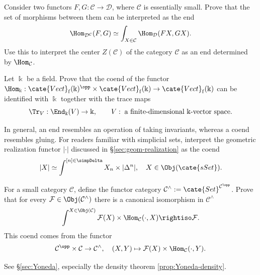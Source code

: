 \begin{Exercises}
	\item Consider two functors $F,G:\mathcal{C}\to\mathcal{D}$, where $\mathcal{C}$ is essentially small. Prove that the set of morphisms between them can be interpreted as the end
	\[ \Hom_{\mathcal{D}^{\mathcal{C}}}(F,G)\simeq
	\int_{X\in\mathcal{C}}\Hom_{\mathcal{D}}(FX,GX). \]
	Use this to interpret the center $Z(\mathcal{C})$ of the category $\mathcal{C}$ as an end determined by $\Hom_{\mathcal{C}}$.

	\item Let $\Bbbk$ be a field. Prove that the coend of the functor
	$\Hom_{\Bbbk}:\cate{Vect}_{\mathrm f}(\Bbbk)^{\opp}\times
	\cate{Vect}_{\mathrm f}(\Bbbk)\to\cate{Vect}_{\mathrm f}(\Bbbk)$
	can be identified with $\Bbbk$ together with the trace maps
	\[ \Tr_V:\End_{\Bbbk}(V)\to\Bbbk,\qquad
	V:\;\text{a finite-dimensional $\Bbbk$-vector space}. \]

	\item In general, an end resembles an operation of taking invariants, whereas a coend resembles gluing. For readers familiar with simplicial sets, interpret the geometric realization functor $|\mathord\cdot|$ discussed in \S\ref{sec:geom-realization} as the coend
	\[ |X|\simeq\int^{[n]\in\simpDelta}X_n\times|\Delta^n|,\quad
	X\in\Obj(\cate{sSet}). \]

	\item For a small category $\mathcal{C}$, define the functor category
	$\mathcal{C}^\wedge:=\cate{Set}^{\mathcal{C}^{\opp}}$. Prove that for every $\mathcal{F}\in\Obj(\mathcal{C}^\wedge)$ there is a canonical isomorphism in $\mathcal{C}^\wedge$
	\[ \int^{X\in\Obj(\mathcal{C})}\mathcal{F}(X)\times
	\Hom_{\mathcal{C}}(\cdot,X)\rightiso\mathcal{F}. \]
	This coend comes from the functor
	\[ \mathcal{C}^{\opp}\times\mathcal{C}\to\mathcal{C}^\wedge,
	\quad(X,Y)\mapsto\mathcal{F}(X)\times\Hom_{\mathcal{C}}(\cdot,Y). \]
	\begin{hint}
		See \S\ref{sec:Yoneda}, especially the density theorem \ref{prop:Yoneda-density}.
	\end{hint}


\end{Exercises}
